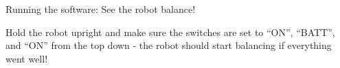 \begin{frame}{Running the software: See the robot balance!}


	Hold the robot upright and make sure the switches are set to ``ON'', ``BATT'', and ``ON'' from the top down - the robot should start balancing if everything went well!
\end{frame}







\begin{frame}{}{}
	
\end{frame}




